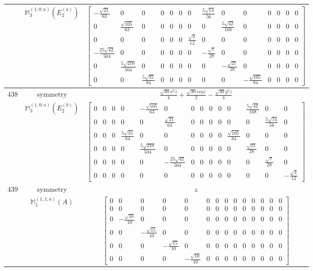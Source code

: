 \documentclass[fleqn,8pt,landscape]{jsarticle}
\begin{document}
\begin{longtable}{ccc}
$  $ & $ \mathbb{M}_{3}^{(1,0;a)}(E_{2}^{(a)}) $ & $ \begin{bmatrix} - \frac{\sqrt{21}}{63} & 0 & 0 & 0 & 0 & 0 & 0 & \frac{5 \sqrt{14}}{56} & 0 & 0 & 0 & 0 & 0 & 0 \\ 0 & \frac{\sqrt{105}}{63} & 0 & 0 & 0 & 0 & 0 & 0 & \frac{5 \sqrt{42}}{168} & 0 & 0 & 0 & 0 & 0 \\ 0 & 0 & 0 & 0 & 0 & 0 & \frac{\sqrt{3}}{12} & 0 & 0 & 0 & 0 & 0 & 0 & 0 \\ - \frac{25 \sqrt{42}}{504} & 0 & 0 & 0 & 0 & 0 & 0 & - \frac{\sqrt{7}}{28} & 0 & 0 & 0 & 0 & 0 & 0 \\ 0 & \frac{5 \sqrt{210}}{504} & 0 & 0 & 0 & 0 & 0 & 0 & - \frac{\sqrt{21}}{28} & 0 & 0 & 0 & 0 & 0 \\ 0 & 0 & \frac{5 \sqrt{35}}{84} & 0 & 0 & 0 & 0 & 0 & 0 & - \frac{\sqrt{105}}{84} & 0 & 0 & 0 & 0 \end{bmatrix} $ \\ \hline
$ 438 $ & $ \text{symmetry} $ & $ \frac{\sqrt{30} x^{2} z}{4} + \frac{\sqrt{30} i x y z}{2} - \frac{\sqrt{30} y^{2} z}{4} $ \\
$  $ & $ \mathbb{M}_{3}^{(1,0;a)}(E_{2}^{(b)}) $ & $ \begin{bmatrix} 0 & 0 & 0 & 0 & - \frac{\sqrt{105}}{63} & 0 & 0 & 0 & 0 & 0 & 0 & \frac{5 \sqrt{42}}{168} & 0 & 0 \\ 0 & 0 & 0 & 0 & 0 & \frac{\sqrt{21}}{63} & 0 & 0 & 0 & 0 & 0 & 0 & \frac{5 \sqrt{14}}{56} & 0 \\ 0 & 0 & 0 & \frac{5 \sqrt{35}}{84} & 0 & 0 & 0 & 0 & 0 & 0 & \frac{\sqrt{105}}{84} & 0 & 0 & 0 \\ 0 & 0 & 0 & 0 & \frac{5 \sqrt{210}}{504} & 0 & 0 & 0 & 0 & 0 & 0 & \frac{\sqrt{21}}{28} & 0 & 0 \\ 0 & 0 & 0 & 0 & 0 & - \frac{25 \sqrt{42}}{504} & 0 & 0 & 0 & 0 & 0 & 0 & \frac{\sqrt{7}}{28} & 0 \\ 0 & 0 & 0 & 0 & 0 & 0 & 0 & 0 & 0 & 0 & 0 & 0 & 0 & - \frac{\sqrt{3}}{12} \end{bmatrix} $ \\ \hline
$ 439 $ & $ \text{symmetry} $ & $ z $ \\
$  $ & $ \mathbb{M}_{1}^{(1,1;a)}(A) $ & $ \begin{bmatrix} 0 & 0 & 0 & 0 & 0 & 0 & 0 & 0 & 0 & 0 & 0 & 0 & 0 & 0 \\ 0 & 0 & 0 & 0 & 0 & 0 & 0 & 0 & 0 & 0 & 0 & 0 & 0 & 0 \\ 0 & - \frac{\sqrt{10}}{10} & 0 & 0 & 0 & 0 & 0 & 0 & 0 & 0 & 0 & 0 & 0 & 0 \\ 0 & 0 & - \frac{\sqrt{15}}{10} & 0 & 0 & 0 & 0 & 0 & 0 & 0 & 0 & 0 & 0 & 0 \\ 0 & 0 & 0 & - \frac{\sqrt{15}}{10} & 0 & 0 & 0 & 0 & 0 & 0 & 0 & 0 & 0 & 0 \\ 0 & 0 & 0 & 0 & - \frac{\sqrt{10}}{10} & 0 & 0 & 0 & 0 & 0 & 0 & 0 & 0 & 0 \end{bmatrix} $ \\ \hline

\end{longtable}
\end{document}
